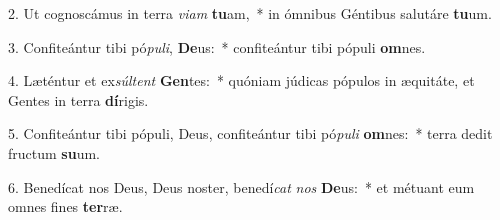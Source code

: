 2. Ut cognoscámus in terra \textit{vi}\textit{am} \textbf{tu}am,~*  in ómnibus Géntibus salutáre \textbf{tu}um.\

3. Confiteántur tibi pó\textit{pu}\textit{li}, \textbf{De}us:~*  confiteántur tibi pópuli \textbf{om}nes.\

4. Læténtur et ex\textit{súl}\textit{tent} \textbf{Gen}tes:~*  quóniam júdicas pópulos in æquitáte, et Gentes in terra \textbf{dí}rigis.\

5. Confiteántur tibi pópuli, Deus, confiteántur tibi pó\textit{pu}\textit{li} \textbf{om}nes:~*  terra dedit fructum \textbf{su}um.\

6. Benedícat nos Deus, Deus noster, benedí\textit{cat} \textit{nos} \textbf{De}us:~*  et métuant eum omnes fines \textbf{ter}ræ.\

